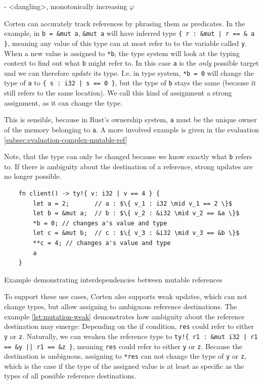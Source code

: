 \documentclass{book}
\newcommand{\code}[1]{\texttt{#1}}
\theoremstyle{definition}
\begin{document}
- <dangling>, monotonically increasing $\varphi$

Corten can accurately track references by phrasing them as predicates.
In the example, in \code{b = \&mut a}, \code{\&mut a} will have inferred type \code{\{ r : \&mut | r == \& a \}}, meaning any value of this type can at most refer to to the variable called \code{y}.
When a new value is assigned to \code{*b}, the type system will look at the typing context to find out what \code{b} might refer to. In this case \code{a} is the \textit{only} possible target und we can therefore \textit{update} its type. I.e. in type system, \code{*b = 0} will change the type of \code{a} to \code{\{ s : i32 | s == 0 \}}, but the type of \code{b} stays the same (because it still refers to the same location). We call this kind of assignment a strong assignment, as it can change the type. 

This is sensible, because in Rust's ownership system, \code{a} must be the unique owner of the memory belonging to \code{a}. 
A more involved example is given in the evaluation \ref{subsec:evaluation-complex-mutable-ref}

Note, that the type can only be changed because we know exactly what \code{b} refers to. If there is ambiguity about the destination of a reference, strong updates are no longer possible.



\begin{listing}[ht]
  \begin{verbatim}
    fn client() -> ty!{ v: i32 | v == 4 } {
        let a = 2;       // a : $\{ v_1 : i32 \mid v_1 == 2 \}$
        let b = &mut a;  // b : $\{ v_2 : &i32 \mid v_2 == &a \}$
        *b = 0; // changes a's value and type
        let c = &mut b;  // c : $\{ v_3 : &i32 \mid v_3 == &b \}$
        **c = 4; // changes a's value and type
        a
    }
  \end{verbatim}
  \caption{Example demonstrating interdependencies between mutable references}
  \label{lst:mutation-strong}
\end{listing}

To support these use cases, Corten also supports weak updates, which can not change types, but allow assigning to ambiguous reference destinations.
The example \ref{lst:mutation-weak} demonstrates how ambiguity about the reference destination may emerge: Depending on the if condition, \code{res} could refer to either \code{y} or \code{z}.
Naturally, we can weaken the reference type to \code{ty!\{ r1 : \&mut i32 | r1 == \&y || r1 == \&z \}}, meaning \code{res} could refer to either \code{y} or \code{z}.
Because the destination is ambiguous, assigning to \code{*res} can not change the type of \code{y} or \code{z}, which is the case if the type of the assigned value is at least as specific as the types of all possible reference destinations.
\end{document}
